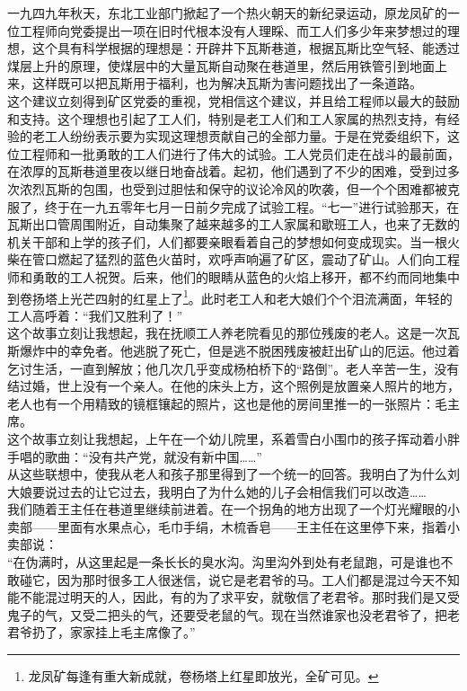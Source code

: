 一九四九年秋天，东北工业部门掀起了一个热火朝天的新纪录运动，原龙凤矿的一位工程师向党委提出一项在旧时代根本没有人理睬、而工人们多少年来梦想过的理想，这个具有科学根据的理想是：开辟井下瓦斯巷道，根据瓦斯比空气轻、能透过煤层上升的原理，使煤层中的大量瓦斯自动聚在巷道里，然后用铁管引到地面上来，这样既可以把瓦斯用于福利，也为解决瓦斯为害问题找出了一条道路。\\

这个建议立刻得到矿区党委的重视，党相信这个建议，并且给工程师以最大的鼓励和支持。这个理想也引起了工人们，特别是老工人们和工人家属的热烈支持，有经验的老工人纷纷表示要为实现这理想贡献自己的全部力量。于是在党委组织下，这位工程师和一批勇敢的工人们进行了伟大的试验。工人党员们走在战斗的最前面，在浓厚的瓦斯巷道里夜以继日地奋战着。起初，他们遇到了不少的困难，受到过多次浓烈瓦斯的包围，也受到过胆怯和保守的议论冷风的吹袭，但一个个困难都被克服了，终于在一九五零年七月一日前夕完成了试验工程。“七一”进行试验那天，在瓦斯出口管周围附近，自动集聚了越来越多的工人家属和歇班工人，也来了无数的机关干部和上学的孩子们，人们都要亲眼看着自己的梦想如何变成现实。当一根火柴在管口燃起了猛烈的蓝色火苗时，欢呼声响遍了矿区，震动了矿山。人们向工程师和勇敢的工人祝贺。后来，他们的眼睛从蓝色的火焰上移开，都不约而同地集中到卷扬塔上光芒四射的红星上了\footnote{龙凤矿每逢有重大新成就，卷杨塔上红星即放光，全矿可见。}。此时老工人和老大娘们个个泪流满面，年轻的工人高呼着：“我们又胜利了！”\\

这个故事立刻让我想起，我在抚顺工人养老院看见的那位残废的老人。这是一次瓦斯爆炸中的幸免者。他逃脱了死亡，但是逃不脱困残废被赶出矿山的厄运。他过着乞讨生活，一直到解放；他几次几乎变成杨柏桥下的“路倒”。老人辛苦一生，没有结过婚，世上没有一个亲人。在他的床头上方，这个照例是放置亲人照片的地方，老人也有一个用精致的镜框镶起的照片，这也是他的房间里推一的一张照片：毛主席。\\

这个故事立刻让我想起，上午在一个幼儿院里，系着雪白小围巾的孩子挥动着小胖手唱的歌曲：“没有共产党，就没有新中国……”\\

从这些联想中，使我从老人和孩子那里得到了一个统一的回答。我明白了为什么刘大娘要说过去的让它过去，我明白了为什么她的儿子会相信我们可以改造……\\

我们随着王主任在巷道里继续前进着。在一个拐角的地方出现了一个灯光耀眼的小卖部——里面有水果点心，毛巾手绢，木梳香皂——王主任在这里停下来，指着小卖部说：\\

“在伪满时，从这里起是一条长长的臭水沟。沟里沟外到处有老鼠跑，可是谁也不敢碰它，因为那时很多工人很迷信，说它是老君爷的马。工人们都是混过今天不知能不能混过明天的人，因此，有的为了求平安，就敬信了老君爷。那时我们是又受鬼子的气，又受二把头的气，还要受老鼠的气。现在当然谁家也没老君爷了，把老君爷扔了，家家挂上毛主席像了。”\\

